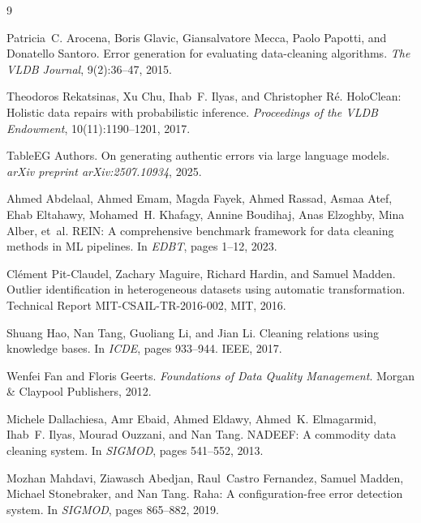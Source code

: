 \documentclass[11pt,a4paper]{article}
\begin{document}
\begin{thebibliography}{9}

Patricia~C. Arocena, Boris Glavic, Giansalvatore Mecca, Paolo Papotti, and Donatello Santoro.
\newblock Error generation for evaluating data-cleaning algorithms.
\newblock \emph{The VLDB Journal}, 9(2):36--47, 2015.

Theodoros Rekatsinas, Xu Chu, Ihab~F. Ilyas, and Christopher R{\'e}.
\newblock HoloClean: Holistic data repairs with probabilistic inference.
\newblock \emph{Proceedings of the VLDB Endowment}, 10(11):1190--1201, 2017.

TableEG Authors.
\newblock On generating authentic errors via large language models.
\newblock \emph{arXiv preprint arXiv:2507.10934}, 2025.

Ahmed Abdelaal, Ahmed Emam, Magda Fayek, Ahmed Rassad, Asmaa Atef, Ehab Eltahawy, Mohamed~H. Khafagy, Annine Boudihaj, Anas Elzoghby, Mina Alber, et~al.
\newblock REIN: A comprehensive benchmark framework for data cleaning methods in ML pipelines.
\newblock In \emph{EDBT}, pages 1--12, 2023.

Cl{\'e}ment Pit-Claudel, Zachary Maguire, Richard Hardin, and Samuel Madden.
\newblock Outlier identification in heterogeneous datasets using automatic transformation.
\newblock Technical Report MIT-CSAIL-TR-2016-002, MIT, 2016.

Shuang Hao, Nan Tang, Guoliang Li, and Jian Li.
\newblock Cleaning relations using knowledge bases.
\newblock In \emph{ICDE}, pages 933--944. IEEE, 2017.

Wenfei Fan and Floris Geerts.
\newblock \emph{Foundations of Data Quality Management}.
\newblock Morgan \& Claypool Publishers, 2012.

Michele Dallachiesa, Amr Ebaid, Ahmed Eldawy, Ahmed~K. Elmagarmid, Ihab~F. Ilyas, Mourad Ouzzani, and Nan Tang.
\newblock NADEEF: A commodity data cleaning system.
\newblock In \emph{SIGMOD}, pages 541--552, 2013.

Mozhan Mahdavi, Ziawasch Abedjan, Raul~Castro Fernandez, Samuel Madden, Michael Stonebraker, and Nan Tang.
\newblock Raha: A configuration-free error detection system.
\newblock In \emph{SIGMOD}, pages 865--882, 2019.

\end{thebibliography}
\end{document}
